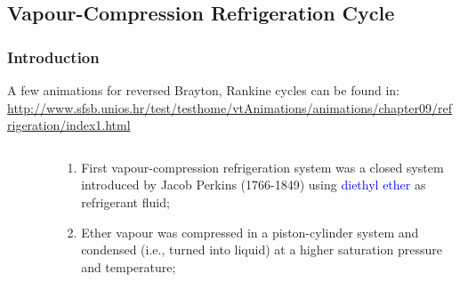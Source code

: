 \documentclass[10pt,compress]{beamer}
\begin{document}
\subsection{Vapour-Compression Refrigeration Cycle}


\begin{frame}
 \frametitle{Introduction}

  \scriptsize A few animations for reversed Brayton, Rankine cycles can be found in:
\href{http://www.sfsb.unios.hr/test/testhome/vtAnimations/animations/chapter09/refrigeration/index1.html}{\scriptsize{http://www.sfsb.unios.hr/test/testhome/vtAnimations/animations/chapter09/refrigeration/index1.html}}


  \begin{columns}
   \begin{column}[c]{0.45\linewidth}
    \begin{figure}%
     \begin{center}
     \end{center}
    \end{figure}  
   \end{column}  
   \begin{column}[c]{0.55\linewidth}
  \begin{enumerate}[(1)]\scriptsize
   \item <2-> First vapour-compression refrigeration system was a closed system introduced by Jacob Perkins (1766-1849) using \textcolor{blue}{diethyl ether} as refrigerant fluid;
   \item <2-> Ether vapour was compressed in a piston-cylinder system and condensed (i.e., turned into liquid) at a higher saturation pressure and temperature;

\end{enumerate}
\end{column}
\end{columns}
\end{frame}
\end{document}
